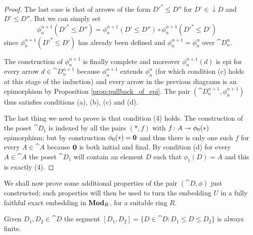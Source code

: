 \begin{proof}
  The last case is that of arrows of the form \(D'^*\leq D''\) for \(D'\in{}\downarrow D\) and \(D'\leq D''\). But we can simply set
  \begin{equation*}
    \phi_n^{\alpha+1}(D'^*\leq D'') = \phi_n^{\alpha+1}(D'\leq D'')\circ\phi_n^{\alpha+1}(D'^*\leq D')
  \end{equation*}
  since \(\phi_n^{\alpha+1}(D'^*\leq D')\) has already been defined and \(\phi_n^{\alpha+1}=\phi_n^\alpha\) over \(\cat{D}_n^\alpha\).

  The construction of \(\phi_n^{\alpha + 1}\) is finally complete and moreover \(\phi_n^{\alpha+1}(d)\) is epi for every arrow \(d\in\cat{D}_n^{\alpha+1}\) because \(\phi_n^{\alpha+1}\) extends \(\phi_n^\alpha\) (for which condition (c) holds at this stage of the induction) and every arrow in the previous diagrams is an epimorphism by Proposition \ref{prop:pullback_of_epi}. The pair \((\cat{D}_n^{\alpha+1},\phi_n^{\alpha+1})\) thus satisfies conditions (a), (b), (c) and (d).

  The last thing we need to prove is that condition (4) holds. The construction of the poset \(\cat{D}_1\) is indexed by all the pairs \((*, f)\) with \(f\colon A\twoheadrightarrow \phi_0(*)\) epimorphism; but by construction \(\phi_0(*) = {\bf 0}\) and thus there is only one such \(f\) for every \(A\in\cat{A}\) because \({\bf 0}\) is both initial and final. By condition (d) for every \(A\in\cat{A}\) the poset \(\cat{D}_1\) will contain an element \(D\) such that \(\phi_1(D) = A\) and this is exactly (4).
\end{proof}

We shall now prove some additional properties of the pair \((\cat{D},\phi)\) just constructed; such properties will then be used to turn the embedding \(U\) in a fully faithful exact embedding in \(\text{\normalfont\textbf{Mod}}_R\), for a suitable ring \(R\).

\begin{lemma}
  \label{lemma:finite_segment}
  Given \(D_1,D_2\in\cat{D}\) the segment \([D_1, D_2] = \{D\in\cat{D}\colon D_1\leq D\leq D_2\}\) is always finite.
\end{lemma}


